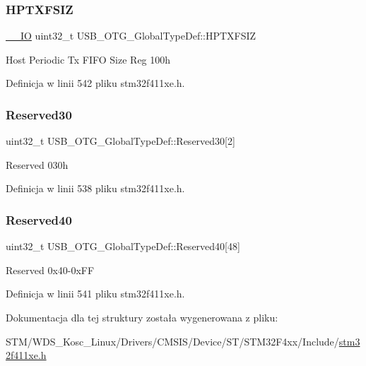 \subsubsection{\texorpdfstring{H\+P\+T\+X\+F\+S\+IZ}{HPTXFSIZ}}
{\footnotesize\ttfamily \hyperlink{core__sc300_8h_aec43007d9998a0a0e01faede4133d6be}{\+\_\+\+\_\+\+IO} uint32\+\_\+t U\+S\+B\+\_\+\+O\+T\+G\+\_\+\+Global\+Type\+Def\+::\+H\+P\+T\+X\+F\+S\+IZ}

Host Periodic Tx F\+I\+FO Size Reg 100h 

Definicja w linii 542 pliku stm32f411xe.\+h.

\mbox{\label{struct_u_s_b___o_t_g___global_type_def_a978a73c27d2afe65def81f28b881e138}} 
\subsubsection{\texorpdfstring{Reserved30}{Reserved30}}
{\footnotesize\ttfamily uint32\+\_\+t U\+S\+B\+\_\+\+O\+T\+G\+\_\+\+Global\+Type\+Def\+::\+Reserved30\mbox{[}2\mbox{]}}

Reserved 030h 

Definicja w linii 538 pliku stm32f411xe.\+h.

\mbox{\label{struct_u_s_b___o_t_g___global_type_def_ab32b3885e27effc89f6ffe83d46ddd8e}} 
\subsubsection{\texorpdfstring{Reserved40}{Reserved40}}
{\footnotesize\ttfamily uint32\+\_\+t U\+S\+B\+\_\+\+O\+T\+G\+\_\+\+Global\+Type\+Def\+::\+Reserved40\mbox{[}48\mbox{]}}

Reserved 0x40-\/0x\+FF 

Definicja w linii 541 pliku stm32f411xe.\+h.



Dokumentacja dla tej struktury została wygenerowana z pliku\+:\begin{DoxyCompactItemize}
\item 
S\+T\+M/\+W\+D\+S\+\_\+\+Kosc\+\_\+\+Linux/\+Drivers/\+C\+M\+S\+I\+S/\+Device/\+S\+T/\+S\+T\+M32\+F4xx/\+Include/\hyperlink{stm32f411xe_8h}{stm32f411xe.\+h}\end{DoxyCompactItemize}
